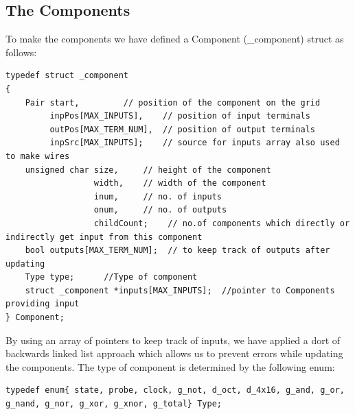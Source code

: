 \documentclass[report]{subfiles}
\begin{document}
\subsection{The Components}
To make the components we have defined a Component (\_component) struct as follows:
\begin{lstlisting}
typedef struct _component
{
    Pair start,         // position of the component on the grid
         inpPos[MAX_INPUTS],    // position of input terminals
         outPos[MAX_TERM_NUM],  // position of output terminals
         inpSrc[MAX_INPUTS];    // source for inputs array also used to make wires
    unsigned char size,     // height of the component
                  width,    // width of the component
                  inum,     // no. of inputs
                  onum,     // no. of outputs
                  childCount;    // no.of components which directly or indirectly get input from this component
    bool outputs[MAX_TERM_NUM];  // to keep track of outputs after updating
    Type type;      //Type of component
    struct _component *inputs[MAX_INPUTS];  //pointer to Components providing input
} Component;
\end{lstlisting}
By using an array of pointers to keep track of inputs,  we have applied a dort of backwards linked list approach which allows us to prevent errors while updating the components. The type of component is determined by the following enum:
\begin{lstlisting}
typedef enum{ state, probe, clock, g_not, d_oct, d_4x16, g_and, g_or, g_nand, g_nor, g_xor, g_xnor, g_total} Type;
\end{lstlisting}
\end{document}
